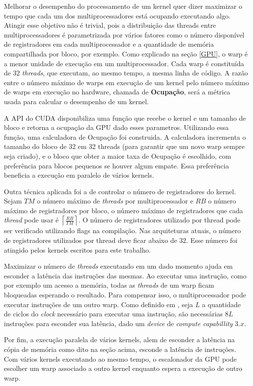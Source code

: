   Melhorar o desempenho do processamento de um kernel quer dizer maximizar o
tempo que cada um dos multiprocessadores está ocupando executando algo. Atingir
esse objetivo não é trivial, pois a distribuição das threads entre multiprocessadores
é parametrizada por vários fatores como o número disponível de registradores
em cada multiprocessador e a quantidade de memória compartilhada por bloco, por exemplo.
Como explicado na seção \ref{GPU}, o warp é a menor unidade de execução em um
multiprocessador. Cada warp é constituída de 32 \textit{threads}, que executam,
ao mesmo tempo, a mesma linha de código. A razão entre o número máximo de warps
em execução de um kernel pelo número máximo de warps em execução no hardware,
chamada de \textbf{Ocupação}, será a métrica usada para calcular o desempenho
de um kernel.

  A API do CUDA disponibiliza uma função que recebe o kernel e um tamanho de
bloco e retorna a ocupação da GPU dado esses parametros. Utilizando essa função,
uma calculadora de Ocupação foi construida. A calculadora incrementa o
tamanho do bloco de 32 em 32 threads (para garantir que um novo warp sempre
seja criado), e o bloco que obter a maior taxa de Ocupação é escolhido, com
preferência para blocos pequenos se houver algum empate. Essa preferência beneficia
a execução em paralelo de vários kernels.

  Outra técnica aplicada foi a de controlar o número de registradores do kernel.
Sejam $TM$ o número máximo de \textit{threads} por multiprocessador e $RB$ o
número máximo de registradores por bloco, o número máximo de registradores que
cada \textit{thread} pode usar é $\left \lceil{\frac{RB}{TM}}\right \rceil$.
O número de registradores utilizado por thread pode ser verificado utilizando
flags na compilação. Nas arquiteturas atuais, o número de registradores
utilizados por thread deve ficar abaixo de $32$. Esse número foi atingido pelos
kernels escritos para este trabalho.

  Maximizar o número de \textit{threads} executando em um dado momento ajuda em
esconder a latência das instruções das mesmas. Ao executar uma instrução,
como por exemplo um acesso a memória, todas as \textit{threads} de um warp
ficam bloqueadas esperando o resultado. Para compensar isso, o multiprocessador
pode executar instruções de um outro warp. Como definido em \cite{cudaProgrammingGuide},
seja $L$ a quantidade de ciclos do \textit{clock} necessário para executar uma
instrução, são necessárias $8L$ instruções para esconder sua latência, dado um
\textit{device} de \textit{compute capabillity} $3.x$.

  Por fim, a execução paralela de vários kernels, alem de esconder a latência
na cópia de memória como dito na seção acima, esconde a latência de instruções.
Com vários kernels executando ao mesmo tempo, o escalonador da GPU pode escolher
um warp associado a outro kernel enquanto espera a execução de outro warp.
